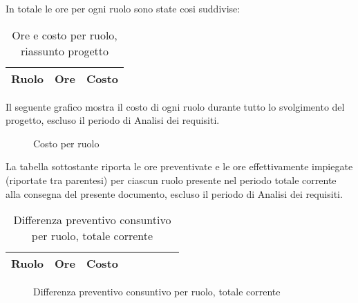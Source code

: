 	In totale le ore per ogni ruolo sono state cosi suddivise:

	\begin{table}[H]
	\centering
	\begin{tabular}{ l c c }
		\textbf{Ruolo} & \textbf{Ore} & \textbf{Costo} \\
		\hline
		
	\end{tabular}
	\caption{Ore e costo per ruolo, riassunto progetto}
	\end{table}

	Il seguente grafico mostra il costo di ogni ruolo durante tutto lo svolgimento del progetto, escluso il periodo di Analisi dei requisiti.

	\begin{figure}[H]
	\begin{tikzpicture}
		
	\end{tikzpicture}
	\caption{Costo per ruolo}
	\end{figure}

	La tabella sottostante riporta le ore preventivate e le ore effettivamente impiegate (riportate tra parentesi) per ciascun ruolo presente nel periodo totale corrente alla consegna del presente documento, escluso il periodo di Analisi dei requisiti.

	\begin{table}[H]
	\centering
	\begin{tabular}{lccccccc}
	\toprule
	    \textbf{Ruolo}  & \textbf{Ore} & \textbf{Costo} \\
	    \midrule
	    
	    \bottomrule
	\end{tabular}
	\caption{Differenza preventivo consuntivo per ruolo, totale corrente}
	\end{table}

	\begin{figure}[H]
	\centering
	\caption{Differenza preventivo consuntivo per ruolo, totale corrente}
	\end{figure}